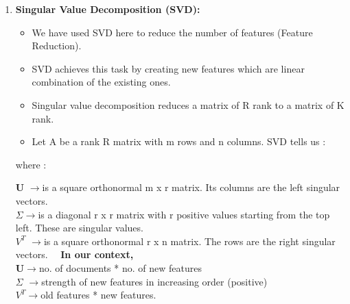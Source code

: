 \documentclass{beamer}
\newcommand\tab[1][1cm]{\hspace*{#1}}
\begin{document}
\begin{frame}[t, allowframebreaks]
\begin{enumerate}
\item \textbf{Singular Value Decomposition (SVD):} \\
\begin{itemize}
\item We have used SVD here to reduce the number of features (Feature Reduction).
\item SVD achieves this task by creating new features which are linear combination of the existing ones.
\item Singular value decomposition reduces a matrix of R rank to a matrix of K rank.
\item Let A be a rank R matrix with m rows and n columns. SVD tells us :
\end{itemize}
\begin{center} 
{\normalsize {}}
\tab \tab where :\end{center}
\setlength\columnsep{5pt}
{\tiny \textbf{U} }$\rightarrow$is a square orthonormal m x r matrix. Its columns are the left singular vectors.\\
{\tiny \textbf{\(\Sigma \)}}$\rightarrow$is a diagonal r x r matrix with r positive values starting from the top left. These are  singular values.\\
{\tiny \textbf{\(V^T \)} }$\rightarrow$is a square orthonormal r x n matrix. The rows are the right singular vectors.
\linebreak
\ \  \textbf{In our context,}\\
{\tiny \textbf{U}}$\rightarrow$no. of documents * no. of new features\\
{\tiny \textbf{\(\Sigma \)} }$\rightarrow$strength of new features in increasing order (positive)\\ 
{\tiny \textbf{\(V^T \)}}$\rightarrow$old features * new features.\\
\end{enumerate}

\end{frame}
\end{document}
